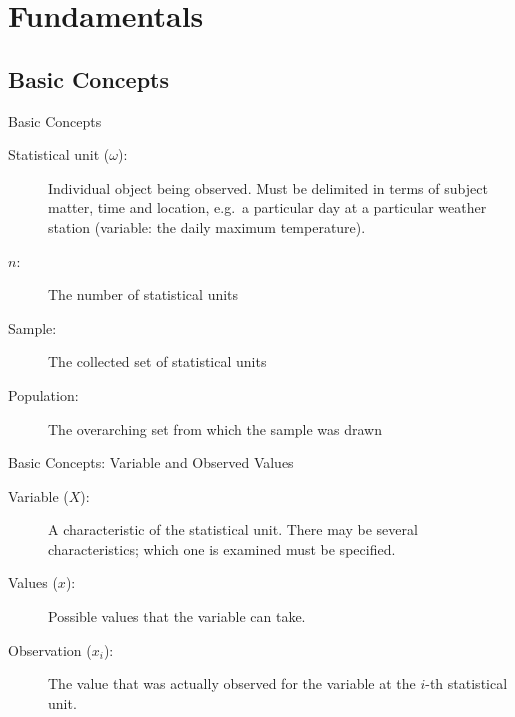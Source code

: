 \documentclass[aspectratio=169,11pt]{beamer}
\begin{document}
\section{Fundamentals}

\subsection{Basic Concepts}

\begin{frame}{Basic Concepts}
  \begin{description}
    \item[Statistical unit ($\omega$):] Individual object being observed. Must be delimited in terms of subject matter, time and location, e.g.\ a particular day at a particular weather station (variable: the daily maximum temperature).

    \item[$n$:] The number of statistical units

    \item[Sample:] The collected set of statistical units

    \item[Population:] The overarching set from which the sample was drawn
  \end{description}
\end{frame}

\begin{frame}{Basic Concepts: Variable and Observed Values}
  \begin{description}
    \item[Variable ($X$):] A characteristic of the statistical unit. There may be several characteristics; which one is examined must be specified.

    \item[Values ($x$):] Possible values that the variable can take.

    \item[Observation ($x_i$):] The value that was actually observed for the variable at the $i$-th statistical unit.
  \end{description}
\end{frame}
\end{document}
